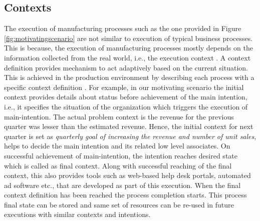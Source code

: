 \subsection{Contexts} 
\label{sec:contexts}
The execution of manufacturing processes such as the one provided in Figure \ref{fig:motivatingscenario} are not similar to execution of typical business processes. This is because, the execution of manufacturing processes mostly depends on the information collected from the real world, i.e., the execution context \cite{Sungur2016}. A context definition provides mechanism to act adaptively based on the current situation. This is achieved in the production environment by describing each process with a specific context definition \cite{Sungur2016}. For example, in our motivating scenario the initial context provides details about status before achievement of the main intention, i.e., it specifies the situation of the organization which triggers the execution of main-intention. The actual problem context is the revenue for the previous quarter was lesser than the estimated revenue. Hence, the initial context for next quarter is set as \textit{quarterly goal of increasing the revenue and number of unit sales}, helps to decide the main intention and its related low level associates. On successful achievement of main-intention, the intention reaches desired state which is called as final context. Along with successful reaching of the final context, this also provides tools such as web-based help desk portals, automated ad software etc., that are developed as part of this execution. When the final context definition has been reached the process completion starts. This process final state can be stored \cite{Sungur2015} and same set of resources can be re-used in future executions with similar contexts and intentions.
 
